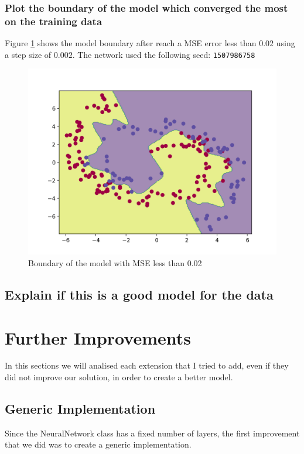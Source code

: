 \documentclass[11pt]{article}
\begin{document}
\subsubsection{Plot the boundary of the model which converged the most on the training data}
Figure \ref{fig: NN_MSE_002_boundary} shows the model boundary after reach a MSE error less than $0.02$ using a step size of $0.002$. The network used the following seed: \texttt{1507986758}
\begin{figure}[H]
\label{fig: NN_MSE_002_boundary}
\centering
\includegraphics[scale=0.5]{images/NN_MSE_002_boundary}	
\caption{Boundary of the model with MSE less than 0.02}
\end{figure}

\subsection{Explain if this is a good model for the data}

\section{Further Improvements}
In this sections we will analised each extension that I tried to add, even if they did not improve our solution, in order to create a better model.
\subsection{Generic Implementation}
Since the NeuralNetwork class has a fixed number of layers, the first improvement that we did was to create a generic implementation.
\end{document}
